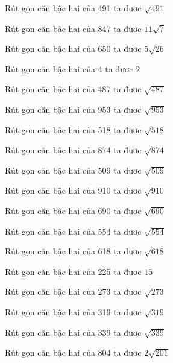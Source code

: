 \documentclass[12pt,a4paper]{article}
\begin{document}
\begin{ex}
Rút gọn căn bậc hai của 491 ta đươc $\sqrt{491}$
\end{ex}
\begin{ex}
Rút gọn căn bậc hai của 847 ta đươc $11\sqrt{7}$
\end{ex}
\begin{ex}
Rút gọn căn bậc hai của 650 ta đươc $5\sqrt{26}$
\end{ex}
\begin{ex}
Rút gọn căn bậc hai của 4 ta đươc $2$
\end{ex}
\begin{ex}
Rút gọn căn bậc hai của 487 ta đươc $\sqrt{487}$
\end{ex}
\begin{ex}
Rút gọn căn bậc hai của 953 ta đươc $\sqrt{953}$
\end{ex}
\begin{ex}
Rút gọn căn bậc hai của 518 ta đươc $\sqrt{518}$
\end{ex}
\begin{ex}
Rút gọn căn bậc hai của 874 ta đươc $\sqrt{874}$
\end{ex}
\begin{ex}
Rút gọn căn bậc hai của 509 ta đươc $\sqrt{509}$
\end{ex}
\begin{ex}
Rút gọn căn bậc hai của 910 ta đươc $\sqrt{910}$
\end{ex}
\begin{ex}
Rút gọn căn bậc hai của 690 ta đươc $\sqrt{690}$
\end{ex}
\begin{ex}
Rút gọn căn bậc hai của 554 ta đươc $\sqrt{554}$
\end{ex}
\begin{ex}
Rút gọn căn bậc hai của 618 ta đươc $\sqrt{618}$
\end{ex}
\begin{ex}
Rút gọn căn bậc hai của 225 ta đươc $15$
\end{ex}
\begin{ex}
Rút gọn căn bậc hai của 273 ta đươc $\sqrt{273}$
\end{ex}
\begin{ex}
Rút gọn căn bậc hai của 319 ta đươc $\sqrt{319}$
\end{ex}
\begin{ex}
Rút gọn căn bậc hai của 339 ta đươc $\sqrt{339}$
\end{ex}
\begin{ex}
Rút gọn căn bậc hai của 804 ta đươc $2\sqrt{201}$
\end{ex}
\end{document}
